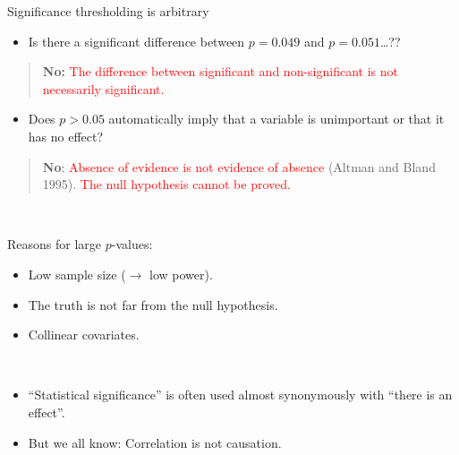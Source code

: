 \documentclass[
  10pt,
  ignorenonframetext,
]{beamer}
\providecommand{\tightlist}{%
  \setlength{\itemsep}{0pt}\setlength{\parskip}{0pt}}
\begin{document}
\begin{frame}
\begin{block}{Significance thresholding is arbitrary}
\protect\hypertarget{significance-thresholding-is-arbitrary}{}
\(~\)

\begin{itemize}
\tightlist
\item
  Is there a significant difference between \(p=0.049\) and
  \(p=0.051\)\ldots??
\end{itemize}

\pause
\vspace{2mm}

\begin{quote}
\textbf{No: }
\textcolor{red}{The difference between significant and non-significant is not necessarily significant.}
\end{quote}

\vspace{2mm}

\pause

\begin{itemize}
\tightlist
\item
  Does \(p>0.05\) automatically imply that a variable is unimportant or
  that it has no effect?
\end{itemize}

\pause
\vspace{2mm}

\begin{quote}
\textbf{No}:
\textcolor{red}{Absence of evidence is not evidence of absence} (Altman
and Bland 1995). \textcolor{red}{The null hypothesis cannot be proved.}
\end{quote}

\pause

\(~\)

Reasons for large \(p\)-values:

\begin{itemize}
\tightlist
\item
  Low sample size (\(\rightarrow\) low power).
\item
  The truth is not far from the null hypothesis.
\item
  Collinear covariates.
\end{itemize}
\end{block}
\end{frame}

\begin{frame}
\(~\)

\begin{itemize}
\tightlist
\item
  ``Statistical significance'' is often used almost synonymously with
  ``there is an effect''.
\end{itemize}

\vspace{2mm}

\begin{itemize}
\tightlist
\item
  But we all know: Correlation is not causation.
\end{itemize}
\end{frame}
\end{document}
